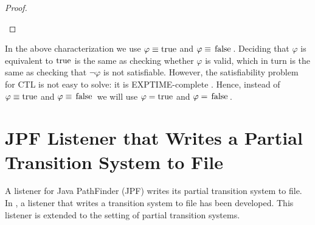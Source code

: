\documentclass[12pt]{article}
\newcommand{\TRUE}{\mbox{\lstinline{true}}}
\newcommand{\FALSE}{\mbox{\lstinline{false}}}
\theoremstyle{definition}
\newenvironment{franck}{\color{red}}{\color{black}}
\begin{document}
\begin{proof}
\begin{itemize}
\begin{franck}





\end{franck}
\end{itemize}
\end{proof}

\begin{franck}
In the above characterization we use $\varphi \equiv \TRUE$ and $\varphi \equiv \FALSE$.  Deciding that $\varphi$ is equivalent to $\TRUE$ is the same as checking whether $\varphi$ is valid, which in turn is the same as checking that $\neg \varphi$ is not satisfiable.  However, the satisfiability problem for CTL is not easy to solve: it is EXPTIME-complete \cite{FL79}.  Hence, instead of $\varphi \equiv \TRUE$ and $\varphi \equiv \FALSE$ we will use $\varphi = \TRUE$ and $\varphi = \FALSE$.
\end{franck}

\section{JPF Listener that Writes a Partial Transition System to File}

A listener for Java PathFinder (JPF) writes its partial transition system to file.  In \cite[Section~7.3]{B20}, a listener that writes a transition system to file has been developed.  This listener is extended to the setting of partial transition systems.
\end{document}

